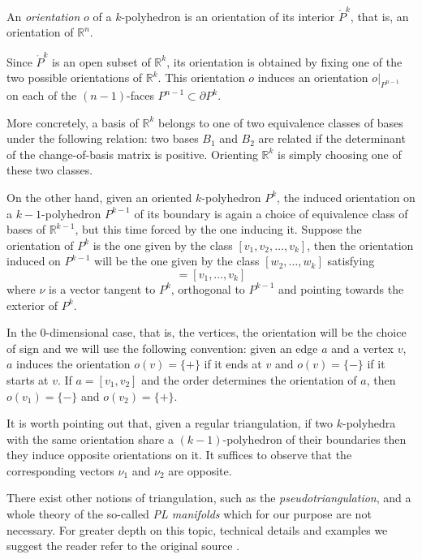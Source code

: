 \begin{definition}
    An \textit{orientation} $o$ of a $k$-polyhedron is an orientation of its interior $\mathring{P}^k$, that is, an orientation of $\mathbb{R}^n$. %
\end{definition}

Since $\mathring{P}^k$ is an open subset of $\mathbb{R}^k$, its orientation is obtained by fixing one of the two possible orientations of $\mathbb{R}^k$. This orientation $o$ induces an orientation $o|_{P^{n-1}}$ on each of the $(n-1)$-faces $P^{n-1}\subset \partial P^k$.

More concretely, a basis of $\mathbb{R}^k$ belongs to one of two equivalence classes of bases under the following relation: two bases $B_1$ and $B_2$ are related if the determinant of the change-of-basis matrix is positive. Orienting $\mathbb{R}^k$ is simply choosing one of these two classes.

On the other hand, given an oriented $k$-polyhedron $P^k$, the induced orientation on a $k-1$-polyhedron $P^{k-1}$ of its boundary is again a choice of equivalence class of bases of $\mathbb{R}^{k-1}$, but this time forced by the one inducing it. Suppose the orientation of $P^k$ is the one given by the class $[v_1,v_2,\dots, v_k]$, then the orientation induced on $P^{k-1}$ will be the one given by the class $[w_2,\dots,w_k]$ satisfying
\begin{equation*}
    [\nu, w_2,\dots, w_k] = [v_1,\dots,v_k]
\end{equation*}
where $\nu$ is a vector tangent to $P^k$, orthogonal to $P^{k-1}$ and pointing towards the exterior of $P^k$.

In the $0$-dimensional case, that is, the vertices, the orientation will be the choice of sign and we will use the following convention: given an edge $a$ and a vertex $v$, $a$ induces the orientation $o(v)=\{+\}$ if it ends at $v$ and $o(v)=\{-\}$ if it starts at $v$. If $a=[v_1,v_2]$ and the order determines the orientation of $a$, then $o(v_1)=\{-\}$ and $o(v_2)=\{+\}$.

It is worth pointing out that, given a regular triangulation, if two $k$-polyhedra with the same orientation share a $(k-1)$-polyhedron of their boundaries then they induce opposite orientations on it. It suffices to observe that the corresponding vectors $\nu_1$ and $\nu_2$ are opposite.

There exist other notions of triangulation, such as the \textit{pseudotriangulation}, and a whole theory of the so-called \textit{PL manifolds} which for our purpose are not necessary. For greater depth on this topic, technical details and examples we suggest the reader refer to the original source \cite{munoz2021}.

